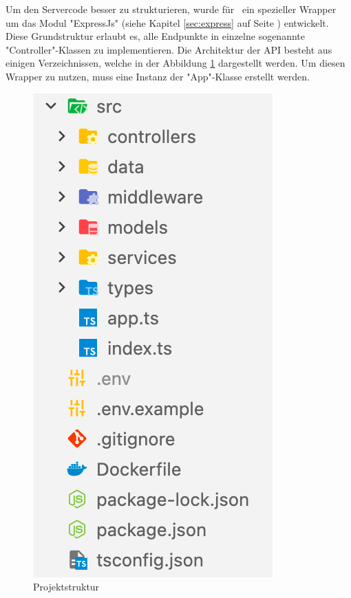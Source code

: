 
Um den Servercode besser zu strukturieren, wurde für \ZELIA\ ein spezieller Wrapper um das Modul "ExpressJs" (siehe Kapitel \ref{sec:express} auf Seite \pageref{sec:express}) entwickelt. 
Diese Grundstruktur erlaubt es, alle Endpunkte in einzelne sogenannte "Controller"-Klassen zu implementieren. 
Die Architektur der API besteht aus einigen Verzeichnissen, welche in der Abbildung \ref{fig:apiStructure} dargestellt werden. 
Um diesen Wrapper zu nutzen, muss eine Instanz der "App"-Klasse erstellt werden.

\begin{figure}[H]
    \centering
    \includegraphics{media/APITemplate/ProjectStructure.png}
    \caption{Projektstruktur}
    \label{fig:apiStructure}
\end{figure}

\clearpage









